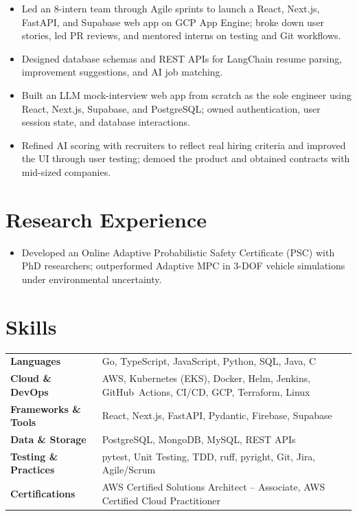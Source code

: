 \documentclass[11pt, letterpaper]{article}
\begin{document}
\begin{itemize}
  \item Led an 8-intern team through Agile sprints to launch a React, Next.js, FastAPI, and Supabase web app on GCP App Engine; broke down user stories, led PR reviews, and mentored interns on testing and Git workflows.
  \item Designed database schemas and REST APIs for LangChain resume parsing, improvement suggestions, and AI job matching.
\end{itemize}

\begin{itemize}
  \item Built an LLM mock-interview web app from scratch as the sole engineer using React, Next.js, Supabase, and PostgreSQL; owned authentication, user session state, and database interactions.
  \item Refined AI scoring with recruiters to reflect real hiring criteria and improved the UI through user testing; demoed the product and obtained contracts with mid-sized companies.
\end{itemize}

\section{Research Experience}
\begin{itemize}
  \item Developed an Online Adaptive Probabilistic Safety Certificate (PSC) with PhD researchers; outperformed Adaptive MPC in 3-DOF vehicle simulations under environmental uncertainty.
\end{itemize}

\section{Skills}
\begin{tabularx}{\textwidth}{@{}l @{\hspace{7pt}} >{\raggedright\arraybackslash}X@{}}
  \textbf{Languages} & Go, TypeScript, JavaScript, Python, SQL, Java, C \\[1pt]
  \textbf{Cloud \& DevOps} & AWS, Kubernetes (EKS), Docker, Helm, Jenkins, GitHub~Actions, CI/CD, GCP, Terraform, Linux \\[1pt]
  \textbf{Frameworks \& Tools} & React, Next.js, FastAPI, Pydantic, Firebase, Supabase \\[1pt]
  \textbf{Data \& Storage} & PostgreSQL, MongoDB, MySQL, REST APIs \\[1pt]
  \textbf{Testing \& Practices} & pytest, Unit Testing, TDD, ruff, pyright, Git, Jira, Agile/Scrum \\[1pt]
  \textbf{Certifications} & AWS Certified Solutions Architect -- Associate, AWS Certified Cloud Practitioner \\
\end{tabularx}
\end{document}
